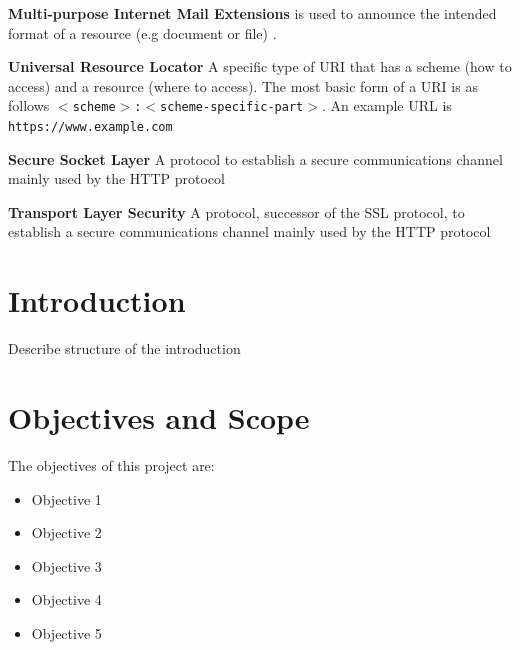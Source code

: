 \documentclass{mscreport}
\begin{document}
\begin{hangparas}{.25in}{1}
\textbf{Multi-purpose Internet Mail Extensions} is used to announce the intended format of a resource (e.g document or file) \cite{Freed2013-yn}. \par
\vspace{0.5cm}
\textbf{Universal Resource Locator} A specific type of URI that has a scheme (how to access) and a resource (where to access). The most basic form of a URI is as follows \texttt{$<$scheme$>$:$<$scheme-specific-part$>$}. An example URL is \newline \texttt{https://www.example.com} \par
\vspace{0.5cm}
\textbf{Secure Socket Layer} A protocol to establish a secure communications channel mainly used by the HTTP protocol \par
\vspace{0.5cm}
\textbf{Transport Layer Security} A protocol, successor of the SSL protocol, to establish a secure communications channel mainly used by the HTTP protocol \par

\end{hangparas}
\clearpage
\newpage

\listoffigures

\clearpage
\newpage
{}
\listoftables

\clearpage
\newpage





\tableofcontents

\newpage
{}
\section{Introduction}
\label{section:intro}

Describe structure of the introduction

\section{Objectives and Scope}

The objectives of this project are:
\begin{itemize}
  \item Objective 1
  \item Objective 2
  \item Objective 3
  \item Objective 4
  \item Objective 5
\end{itemize}  
\end{document}
